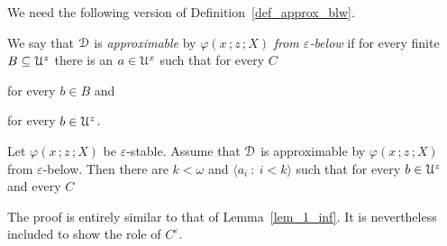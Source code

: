 We need the following version of Definition~\ref{def_approx_blw}.

\begin{definition}\label{def_e_approx_blw}\strut
  We say that ${\EuScript D}$ is \emph{approximable\/} by $\varphi(x\,;z\,;X)$ \emph{from $\varepsilon$-below\/} if for every finite $B\subseteq{\EuScript U}^z$ there is an $a\in{\EuScript U}^x$ such that for every $C$\smallskip

  \hfill for every $b\in B$ and\smallskip

  \hfill for every $b\in{\EuScript U}^z$.\smallskip
\end{definition}


\begin{lemma}
  Let $\varphi(x\,;z\,;X)$ be $\varepsilon$-stable.
  Assume that ${\EuScript D}$ is approximable by $\varphi(x\,;z\,;X)$ from $\varepsilon$-below.
  Then there are $k<\omega$ and $\langle a_i\ :\ i<k\rangle$ such that for every $b\in{\EuScript U}^z$ and every $C$\medskip

  \medskip 

\end{lemma}

The proof is entirely similar to that of Lemma~\ref{lem_1_inf}.
It is nevertheless included to show the role of $C^\varepsilon$.

